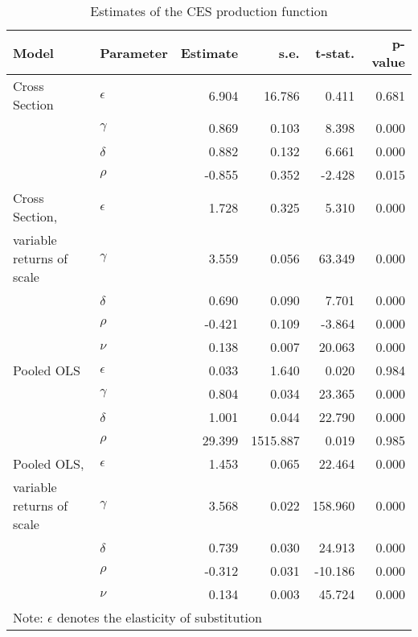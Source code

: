 \documentclass[12pt,a4paper]{article}\usepackage[]{graphicx}\usepackage[]{color}
\begin{document}
\begin{table}[ht]
\centering
\caption{Estimates of the CES production function} 
\label{tab:ces}
\begin{tabular}{llrrrr}
  \toprule
Model & Parameter & Estimate & s.e. & t-stat. & p-value \\ 
  \midrule
Cross Section & $\epsilon$ & 6.904 & 16.786 & 0.411 & 0.681 \\ 
   & $\gamma$ & 0.869 & 0.103 & 8.398 & 0.000 \\ 
   & $\delta$ & 0.882 & 0.132 & 6.661 & 0.000 \\ 
   & $\rho$ & -0.855 & 0.352 & -2.428 & 0.015 \\ 
   \midrule
Cross Section, & $\epsilon$ & 1.728 & 0.325 & 5.310 & 0.000 \\ 
  variable returns of scale & $\gamma$ & 3.559 & 0.056 & 63.349 & 0.000 \\ 
   & $\delta$ & 0.690 & 0.090 & 7.701 & 0.000 \\ 
   & $\rho$ & -0.421 & 0.109 & -3.864 & 0.000 \\ 
   & $\nu$ & 0.138 & 0.007 & 20.063 & 0.000 \\ 
   \midrule
Pooled OLS & $\epsilon$ & 0.033 & 1.640 & 0.020 & 0.984 \\ 
   & $\gamma$ & 0.804 & 0.034 & 23.365 & 0.000 \\ 
   & $\delta$ & 1.001 & 0.044 & 22.790 & 0.000 \\ 
   & $\rho$ & 29.399 & 1515.887 & 0.019 & 0.985 \\ 
   \midrule
Pooled OLS, & $\epsilon$ & 1.453 & 0.065 & 22.464 & 0.000 \\ 
  variable returns of scale & $\gamma$ & 3.568 & 0.022 & 158.960 & 0.000 \\ 
   & $\delta$ & 0.739 & 0.030 & 24.913 & 0.000 \\ 
   & $\rho$ & -0.312 & 0.031 & -10.186 & 0.000 \\ 
   & $\nu$ & 0.134 & 0.003 & 45.724 & 0.000 \\ 
   \midrule 
 \multicolumn{5}{l}{\footnotesize{Note: $\epsilon$ denotes the elasticity of substitution}} \\ 
 \bottomrule
\end{tabular}
\end{table}
\end{document}
